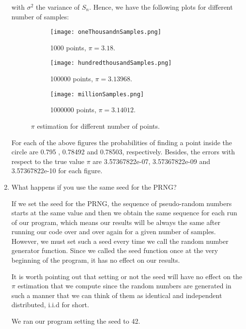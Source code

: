\documentclass[12pt,letterpaper]{report}
\begin{document}
\begin{enumerate}
		with $\sigma^2$ the variance of $S_{n}$. Hence, we have the following plots for different number of samples:
		
		\begin{figure}[H]
			\centering
			\begin{subfigure}[b]{0.37\linewidth}
				\centering
				\texttt{[image: oneThousandnSamples.png]}
				\caption{1000 points, $\pi=3.18$.}
			\end{subfigure}		
			\hfill
			\begin{subfigure}[b]{0.37\linewidth}
				\centering
				\texttt{[image: hundredthousandSamples.png]}
				\caption{100000 points, $\pi = 3.13968$.}
			\end{subfigure}		
			\begin{subfigure}[b]{0.37\linewidth}
				\centering
				\texttt{[image: millionSamples.png]}
				\caption{1000000 points, $\pi=3.14012$.}
			\end{subfigure}		
			\caption{$\pi$ estimation for different number of points.}
			\label{fig::que2_pi}
		\end{figure}    
		
		For each of the above figures the probabilities of finding a point inside the circle are 0.795  , 0.78492 and 0.78503, respectively. Besides, the errors with respect to the true value $\pi$ are 3.57367822e-07, 3.57367822e-09 and 3.57367822e-10 for each figure.  	
		
		\item
		What happens if you use the same seed for the PRNG?
		
		If we set the seed for the PRNG, the sequence of pseudo-random numbers starts at the same value and then we obtain the same sequence for each run of our program, which means our results will be always the same after running our code over and over again for a given number of samples.
		However, we must set such a seed every time we call the random number generator function. Since we  called the seed function once at the very beginning of the program, it has no effect on our results.
		
		It is worth pointing out that setting or not the seed will have no effect on the $\pi$ estimation that we compute since the random numbers are generated in such a manner that we can think of them as identical and independent distributed, i.i.d for short. 
		
		We ran our program setting the seed to 42.
		

\end{enumerate}
\end{document}
